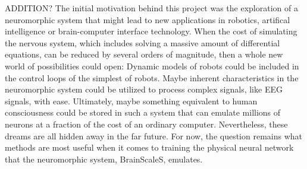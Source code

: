 ADDITION?
The initial motivation behind this project was the exploration of a neuromorphic system that might lead to new applications in robotics, artifical intelligence or brain-computer interface technology.
When the cost of simulating the nervous system, which includes solving a massive amount of differential equations, can be reduced by several orders of magnitude, then a whole new world of possibilities could open:
Dynamic models of robots could be included in the control loops of the simplest of robots.
Maybe inherent characteristics in the neuromorphic system could be utilized to process complex signals, like EEG signals, with ease.
Ultimately, maybe something equivalent to human consciousness could be stored in such a system that can emulate millions of neurons at a fraction of the cost of an ordinary computer.
Nevertheless, these dreams are all hidden away in the far future.
For now, the question remains what methods are most useful when it comes to training the physical neural network that the neuromorphic system, BrainScaleS, emulates.
